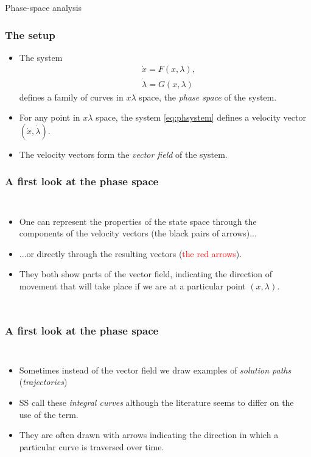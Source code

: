 \documentclass[10pt]{beamer}
\theoremstyle{definition}
\begin{document}
\begin{section}{Phase-space analysis}
\begin{frame}[fragile]
\frametitle{The setup}
\begin{itemize}\itemsep1em
\item The system \begin{equation}\label{eq:phsystem}
\begin{split}
& \dot{x}=F(x,\lambda),\\
& \dot{\lambda} = G(x,\lambda)
\end{split} \end{equation} defines a family of curves in $ x\lambda $ space, the \emph{phase space} of the system.
\item For any point in $ x\lambda $ space, the system \eqref{eq:phsystem} defines a velocity vector $ (\dot{x},\dot{\lambda}) $.
\item The velocity vectors form the \emph{vector field} of the system.
\end{itemize}
\end{frame}

\begin{frame}[fragile]
\frametitle{A first look at the phase space}
\begin{columns}
\begin{itemize}\itemsep1em
\item One can represent the properties of the state space through the components of the velocity vectors (the black pairs of arrows)...
\item ...or directly through the resulting vectors (\textcolor{red}{the red arrows}).
\item They both show parts of the vector field, indicating the direction of movement that will take place if we are at a particular point $ (x,\lambda) $.
\end{itemize}
\begin{center}

\end{center}
\end{columns}
\end{frame}

\begin{frame}[fragile]
\frametitle{A first look at the phase space}
\begin{columns}
\begin{itemize}\itemsep1em
\item Sometimes instead of the vector field we draw examples of \emph{solution paths} (\emph{trajectories})
\item SS call these \emph{integral curves} although the literature seems to differ on the use of the term.
\item They are often drawn with arrows indicating the direction in which a particular curve is traversed over time.
\end{itemize}
\begin{center}

\end{center}
\end{columns}
\end{frame}


\end{section}
\end{document}

